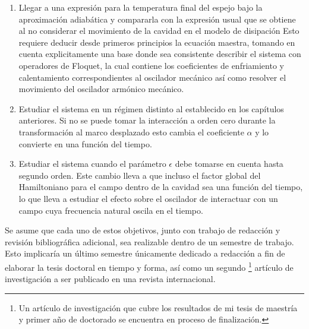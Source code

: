 \documentclass[10pt,a4paper]{report}
\begin{document}
\begin{enumerate}
\item Llegar a una expresión para la temperatura final del espejo bajo
  la aproximación adiabática y compararla con la expresión usual que
  se obtiene al no considerar  el movimiento de la
    cavidad en el modelo de disipación  Esto requiere deducir desde primeros principios la
  ecuación maestra, tomando en cuenta explicitamente una base
    donde sea consistente describir el sistema con operadores de
    Floquet, la cual contiene los coeficientes de enfriamiento y
  calentamiento correspondientes al oscilador mecánico así como
  resolver el movimiento del oscilador armónico mecánico.

\item Estudiar el sistema en un régimen distinto al establecido en los
  capítulos anteriores. Si no se puede tomar la interacción a orden
  cero durante la transformación al marco desplazado esto cambia el
  coeficiente $\alpha$ y lo convierte en una función del tiempo.

\item Estudiar el sistema cuando el parámetro $\epsilon$ debe tomarse en cuenta hasta segundo orden. Este cambio lleva a que incluso el factor global del Hamiltoniano para el campo dentro de la cavidad sea una función del tiempo, lo que lleva a estudiar el efecto sobre el oscilador de interactuar con un campo cuya frecuencia natural oscila en el tiempo. 
\end{enumerate}

Se asume que cada uno de estos objetivos, junto con trabajo de
redacción y revisión bibliográfica adicional, sea realizable dentro de
un semestre de trabajo. Esto implicaría un último semestre únicamente
dedicado a redacción a fin de elaborar la tesis doctoral en tiempo y
forma, así como un segundo \footnote{Un artículo de investigación que cubre los resultados de mi tesis de maestría y primer año de doctorado se encuentra en proceso de finalización.}  artículo de investigación
a ser publicado en una revista internacional.





\end{document}
